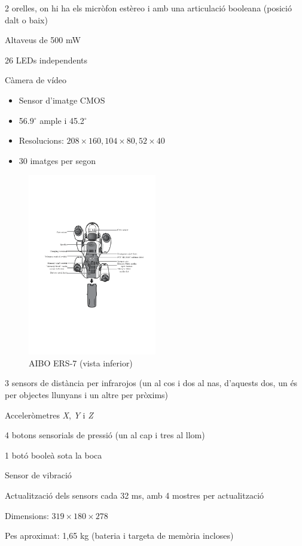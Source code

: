 \documentclass[12pt,a4paper,final,twoside]{article}
\begin{document}
\begin{itemize}
\begin{minipage}[t]{\textwidth}
\item 2 orelles, on hi ha els micròfon estèreo i amb una articulació booleana (posició dalt o baix)
\item Altaveus de 500 mW
\item 26 LEDs independents
\item Càmera de vídeo
\begin{itemize}
\item Sensor d'imatge CMOS
\item 56.9$^{\circ}$ ample i 45.2$^{\circ}$
\item Resolucions: $208\times160, 104\times80, 52\times40$
\item 30 imatges per segon
\end{itemize}
\end{minipage}

\begin{minipage}[t]{\textwidth}
\begin{figure}
        			\includegraphics[width=0.5\textwidth]{Imatges/ERS-7(stomach)}
                \caption{AIBO ERS-7 (vista inferior) \cite{Aibo_Images}}
\end{figure}
\item 3 sensors de distància per infrarojos (un al cos i dos al nas, d'aquests dos, un és per objectes llunyans i un altre per pròxims)
\item Acceleròmetres \textit{X}, \textit{Y} i \textit{Z}
\item 4 botons sensorials de pressió (un al cap i tres al llom)
\item 1 botó booleà sota la boca
\item Sensor de vibració
\item Actualització dels sensors cada 32 ms, amb 4 mostres per actualització
\item Dimensions: $319\times180\times278$
\item Pes aproximat: 1,65 kg (bateria i targeta de memòria incloses)
\end{minipage}
\end{itemize}
\end{document}
